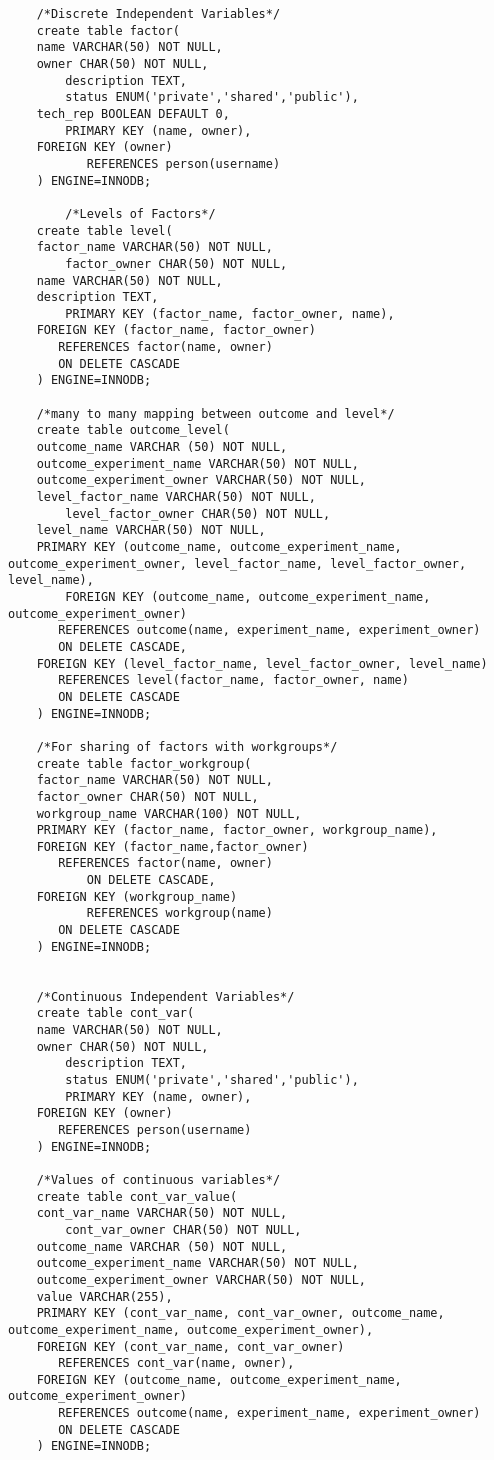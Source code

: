\begin{tiny}
\begin{verbatim}
 	/*Discrete Independent Variables*/
 	create table factor(
 	name VARCHAR(50) NOT NULL,
 	owner CHAR(50) NOT NULL,
        description TEXT,
        status ENUM('private','shared','public'),
	tech_rep BOOLEAN DEFAULT 0,
        PRIMARY KEY (name, owner),
	FOREIGN KEY (owner)
    	   REFERENCES person(username)
 	) ENGINE=INNODB;

        /*Levels of Factors*/
 	create table level(
 	factor_name VARCHAR(50) NOT NULL,
        factor_owner CHAR(50) NOT NULL,
 	name VARCHAR(50) NOT NULL,
 	description TEXT,
        PRIMARY KEY (factor_name, factor_owner, name),
	FOREIGN KEY (factor_name, factor_owner)
	   REFERENCES factor(name, owner)
	   ON DELETE CASCADE
 	) ENGINE=INNODB;

	/*many to many mapping between outcome and level*/
	create table outcome_level(
	outcome_name VARCHAR (50) NOT NULL,
	outcome_experiment_name VARCHAR(50) NOT NULL,
	outcome_experiment_owner VARCHAR(50) NOT NULL,
	level_factor_name VARCHAR(50) NOT NULL,
        level_factor_owner CHAR(50) NOT NULL,
 	level_name VARCHAR(50) NOT NULL,
	PRIMARY KEY (outcome_name, outcome_experiment_name, outcome_experiment_owner, level_factor_name, level_factor_owner, level_name),
        FOREIGN KEY (outcome_name, outcome_experiment_name, outcome_experiment_owner)
	   REFERENCES outcome(name, experiment_name, experiment_owner)	
	   ON DELETE CASCADE,
	FOREIGN KEY (level_factor_name, level_factor_owner, level_name)
  	   REFERENCES level(factor_name, factor_owner, name)
	   ON DELETE CASCADE
	) ENGINE=INNODB;

	/*For sharing of factors with workgroups*/
 	create table factor_workgroup(
	factor_name VARCHAR(50) NOT NULL,
	factor_owner CHAR(50) NOT NULL,
	workgroup_name VARCHAR(100) NOT NULL,
	PRIMARY KEY (factor_name, factor_owner, workgroup_name),
	FOREIGN KEY (factor_name,factor_owner)
	   REFERENCES factor(name, owner)
           ON DELETE CASCADE,
	FOREIGN KEY (workgroup_name)
           REFERENCES workgroup(name)
	   ON DELETE CASCADE
	) ENGINE=INNODB;	


	/*Continuous Independent Variables*/
	create table cont_var(
	name VARCHAR(50) NOT NULL,
 	owner CHAR(50) NOT NULL,
        description TEXT,
        status ENUM('private','shared','public'),
        PRIMARY KEY (name, owner),
	FOREIGN KEY (owner)
  	   REFERENCES person(username)
	) ENGINE=INNODB;

	/*Values of continuous variables*/
	create table cont_var_value(
	cont_var_name VARCHAR(50) NOT NULL,
        cont_var_owner CHAR(50) NOT NULL,
	outcome_name VARCHAR (50) NOT NULL,
	outcome_experiment_name VARCHAR(50) NOT NULL,
	outcome_experiment_owner VARCHAR(50) NOT NULL,
	value VARCHAR(255),
	PRIMARY KEY (cont_var_name, cont_var_owner, outcome_name, outcome_experiment_name, outcome_experiment_owner),
	FOREIGN KEY (cont_var_name, cont_var_owner)
 	   REFERENCES cont_var(name, owner),
	FOREIGN KEY (outcome_name, outcome_experiment_name, outcome_experiment_owner)
	   REFERENCES outcome(name, experiment_name, experiment_owner)
	   ON DELETE CASCADE
	) ENGINE=INNODB;


\end{verbatim}
\end{tiny}

